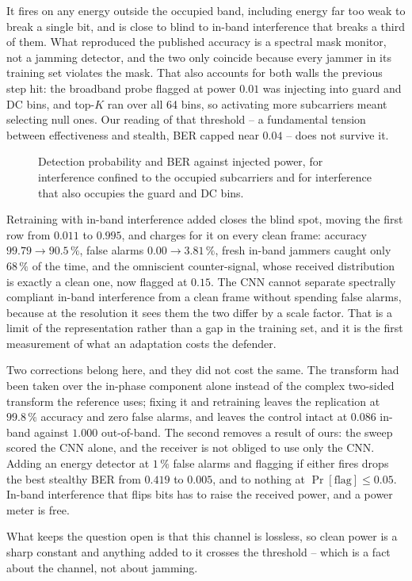 It fires on any energy outside the occupied band, including energy far too weak to break a single bit,
and is close to blind to in-band interference that breaks a third of them.
What reproduced the published accuracy is a spectral mask monitor, not a jamming detector, and the two
only coincide because every jammer in its training set violates the mask.
That also accounts for both walls the previous step hit: the broadband probe flagged at power $0.01$
was injecting into guard and DC bins, and top-$K$ ran over all 64 bins, so activating more subcarriers
meant selecting null ones.
Our reading of that threshold -- a fundamental tension between effectiveness and stealth, BER capped
near $0.04$ -- does not survive it.

\begin{figure}[!t]
\centering
\caption{Detection probability and BER against injected power, for interference confined to the
occupied subcarriers and for interference that also occupies the guard and DC bins.}
\label{fig:inband}
\end{figure}

Retraining with in-band interference added closes the blind spot, moving the first row from $0.011$ to
$0.995$, and charges for it on every clean frame: accuracy $99.79 \to 90.5\,\%$, false alarms
$0.00 \to 3.81\,\%$, fresh in-band jammers caught only $68\,\%$ of the time, and the omniscient
counter-signal, whose received distribution is exactly a clean one, now flagged at $0.15$.
The CNN cannot separate spectrally compliant in-band interference from a clean frame without spending
false alarms, because at the resolution it sees them the two differ by a scale factor.
That is a limit of the representation rather than a gap in the training set, and it is the first
measurement of what an adaptation costs the defender.

Two corrections belong here, and they did not cost the same.
The transform had been taken over the in-phase component alone instead of the complex two-sided
transform the reference uses; fixing it and retraining leaves the replication at $99.8\,\%$ accuracy and
zero false alarms, and leaves the control intact at $0.086$ in-band against $1.000$ out-of-band.
The second removes a result of ours: the sweep scored the CNN alone, and the receiver is not obliged to
use only the CNN.
Adding an energy detector at $1\,\%$ false alarms and flagging if either fires drops the best stealthy
BER from $0.419$ to $0.005$, and to nothing at $\Pr[\text{flag}] \leq 0.05$.
In-band interference that flips bits has to raise the received power, and a power meter is free.

What keeps the question open is that this channel is lossless, so clean power is a sharp constant and
anything added to it crosses the threshold -- which is a fact about the channel, not about jamming.
